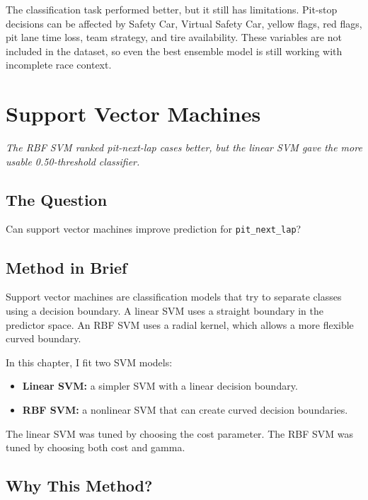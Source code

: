 \documentclass[11pt,oneside,openany]{book}
\newcommand{\chapterquote}[1]{%
\begin{center}
\small\textit{#1}
\end{center}
\vspace{-0.5em}
}
\begin{document}
The classification task performed better, but it still has limitations. Pit-stop decisions can be affected by Safety Car, Virtual Safety Car, yellow flags, red flags, pit lane time loss, team strategy, and tire availability. These variables are not included in the dataset, so even the best ensemble model is still working with incomplete race context.


\chapter{Support Vector Machines}
\chapterquote{The RBF SVM ranked pit-next-lap cases better, but the linear SVM gave the more usable 0.50-threshold classifier.}

\section{The Question}

Can support vector machines improve prediction for \texttt{pit\_next\_lap}?

\section{Method in Brief}

Support vector machines are classification models that try to separate classes using a decision boundary. A linear SVM uses a straight boundary in the predictor space. An RBF SVM uses a radial kernel, which allows a more flexible curved boundary.

In this chapter, I fit two SVM models:

\begin{itemize}
    \item \textbf{Linear SVM:} a simpler SVM with a linear decision boundary.
    \item \textbf{RBF SVM:} a nonlinear SVM that can create curved decision boundaries.
\end{itemize}

The linear SVM was tuned by choosing the cost parameter. The RBF SVM was tuned by choosing both cost and gamma.

\section{Why This Method?}
\end{document}
